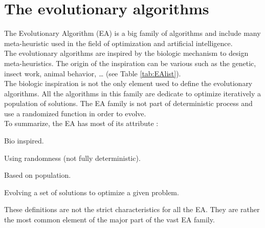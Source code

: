 \section{The evolutionary algorithms }
The Evolutionary Algorithm (EA) is a big family of algorithms and include many meta-heuristic used in the field of optimization and artificial intelligence.\\
 The evolutionary algorithms are inspired by the biologic mechanism to design meta-heuristics. The origin of the inspiration can be various such as  the genetic, insect work, animal behavior, … (see Table  \ref{tab:EAlist}). \\
 The biologic inspiration is not the only element used to define the evolutionary algorithms. All the algorithms in this family are dedicate to optimize iteratively a population of solutions. 
 The EA family is not part of deterministic process and use a randomized function in order to evolve. \\
 To summarize, the EA has most of its attribute : 
\begin{description}
\item Bio inspired. 
\item Using randomness  (not fully deterministic).
\item Based on population. 
\item Evolving a set of solutions to optimize a given problem.
\end{description}
These definitions are not the strict characteristics for all the EA. They are rather the most common element of the major part of the vast EA family. %
 

